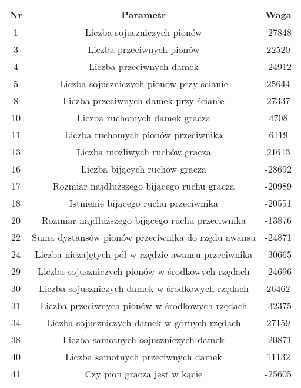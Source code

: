 \label{results-params-opt}

{
\begin{center}
\begin{table}
\centering
{
\footnotesize
\begin{tabular}{|| c | c | c ||}
 \hline
 Nr & Parametr & Waga \\ %
 \hline\hline
 1 & Liczba sojuszniczych pionów & -27848 \\ 
 \hline
 3 & Liczba przeciwnych pionów & 22520 \\
 \hline
 4 & Liczba przeciwnych damek & -24912 \\
 \hline
 5 & Liczba sojuszniczych pionów przy ścianie & 25644 \\
 \hline
 8 & Liczba przeciwnych damek przy ścianie & 27337 \\
 \hline
 10 & Liczba ruchomych damek gracza & 4708 \\
 \hline
 11 & Liczba ruchomych pionów przeciwnika & 6119 \\ 
 \hline
 13 & Liczba możliwych ruchów gracza & 21613 \\
 \hline
 16 & Liczba bijących ruchów gracza & -28692 \\ 
 \hline
 17 & Rozmiar najdłuższego bijącego ruchu gracza & -20989 \\
 \hline
 18 & Istnienie bijącego ruchu przeciwnika & -20551 \\
 \hline
 20 & Rozmiar najdłuższego bijącego ruchu przeciwnika & -13876 \\
 \hline
 22 & Suma dystansów pionów przeciwnika do rzędu awansu & -24871 \\
 \hline
 24 & Liczba niezajętych pól w rzędzie awansu przeciwnika & -30665 \\
 \hline
 29 & Liczba sojuszniczych pionów w środkowych rzędach & -24696 \\
 \hline
 30 & Liczba sojuszniczych damek w środkowych rzędach & 26462 \\
 \hline
 31 & Liczba przeciwnych pionów w środkowych rzędach & -32375 \\
 \hline
 34 & Liczba sojuszniczych damek w górnych rzędach & 27159 \\
 \hline
 38 & Liczba samotnych sojuszniczych damek & -20871 \\
 \hline
 40 & Liczba samotnych przeciwnych damek & 11132 \\
 \hline
 41 & Czy pion gracza jest w kącie & -25605 \\
 \hline

\end{tabular}}
\end{table}
\end{center}}
